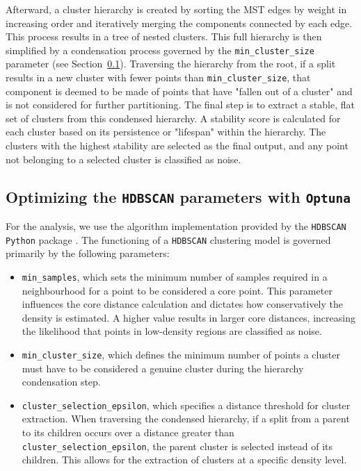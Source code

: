 Afterward, a cluster hierarchy is created by sorting the MST edges by weight in increasing order and iteratively merging the components connected by each edge. This process results in a tree of nested clusters. This full hierarchy is then simplified by a condensation process governed by the \texttt{min\_cluster\_size} parameter (see Section~\ref{sec:hdbscan_tuning}). Traversing the hierarchy from the root, if a split results in a new cluster with fewer points than \texttt{min\_cluster\_size}, that component is deemed to be made of points that have "fallen out of a cluster" and is not considered for further partitioning. The final step is to extract a stable, flat set of clusters from this condensed hierarchy. A stability score is calculated for each cluster based on its persistence or "lifespan" within the hierarchy. The clusters with the highest stability are selected as the final output, and any point not belonging to a selected cluster is classified as noise.


\subsection{Optimizing the \texttt{HDBSCAN} parameters with \texttt{Optuna}}
\label{sec:hdbscan_tuning}

For the analysis, we use the algorithm implementation provided by the \texttt{HDBSCAN} \texttt{Python} package \citep{McInnes2017}. The functioning of a \texttt{HDBSCAN} clustering model is governed primarily by the following parameters:

\begin{itemize}
    \item \texttt{min\_samples}, which sets the minimum number of samples required in a neighbourhood for a point to be considered a core point. This parameter influences the core distance calculation and dictates how conservatively the density is estimated. A higher value results in larger core distances, increasing the likelihood that points in low-density regions are classified as noise.

    \item \texttt{min\_cluster\_size}, which defines the minimum number of points a cluster must have to be considered a genuine cluster during the hierarchy condensation step.

    \item \texttt{cluster\_selection\_epsilon}, which specifies a distance threshold for cluster extraction. When traversing the condensed hierarchy, if a split from a parent to its children occurs over a distance greater than \texttt{cluster\_selection\_epsilon}, the parent cluster is selected instead of its children. This allows for the extraction of clusters at a specific density level.
\end{itemize}

